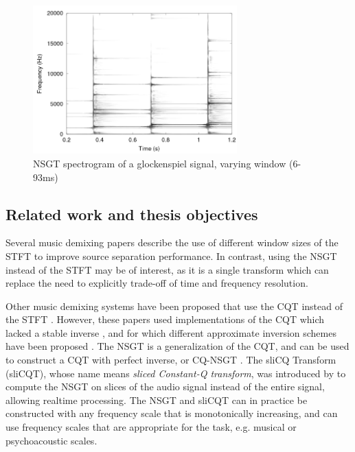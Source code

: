 \documentclass[report.tex]{subfiles}
\begin{document}
\begin{figure}[ht]
	\centering
	\includegraphics[width=0.7\textwidth]{./images-tftheory/tf_tradeoff_balasz3.png}
	\caption{NSGT spectrogram of a glockenspiel signal, varying window (6-93ms) \parencite[4]{jaillet}}
	\label{fig:nsgttradeoff}
\end{figure}

\subsection{Related work and thesis objectives}

Several music demixing papers \parencite{fitzgerald1, driedger, tftradeoff1, tftradeoff2} describe the use of different window sizes of the STFT to improve source separation performance. In contrast, using the NSGT instead of the STFT may be of interest, as it is a single transform which can replace the need to explicitly trade-off of time and frequency resolution.

Other music demixing systems have been proposed that use the CQT instead of the STFT \parencite{fitzgerald2, cqtseparation, bettermusicsep}. However, these papers used implementations of the CQT which lacked a stable inverse \parencite{lackinverse}, and for which different approximate inversion schemes have been proposed \parencite{klapuricqt, fitzgeraldcqt}. The NSGT is a generalization of the CQT, and can be used to construct a CQT with perfect inverse, or CQ-NSGT \parencite{invertiblecqt, variableq1}. The sliCQ Transform (sliCQT), whose name means \textit{sliced Constant-Q transform}, was introduced by \textcite{slicq} to compute the NSGT on slices of the audio signal instead of the entire signal, allowing realtime processing. The NSGT and sliCQT can in practice be constructed with any frequency scale that is monotonically increasing, and can use frequency scales that are appropriate for the task, e.g. musical or psychoacoustic scales.
\end{document}
